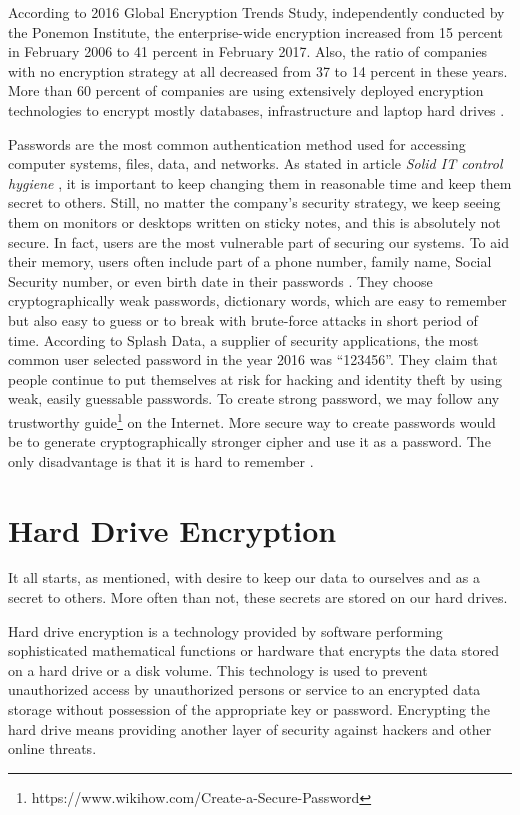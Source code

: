 According to 2016 Global Encryption Trends Study, independently conducted by the Ponemon Institute, the enterprise-wide encryption increased from 15 percent in February 2006 to 41 percent in February 2017.
Also, the ratio of companies with no encryption strategy at all decreased from 37 to 14 percent in these years.
More than 60 percent of companies are using extensively deployed encryption technologies to encrypt mostly databases, infrastructure and laptop hard drives \cite{Thales}.

Passwords are the most common authentication method used for accessing computer systems, files, data, and networks.
As stated in article {\it Solid IT control hygiene} \cite{Perry2017}\label{rotation}, it is important to keep changing them in reasonable time and keep them secret to others.
Still, no matter the company's security strategy, we keep seeing them on monitors or desktops written on sticky notes, and this is absolutely not secure.
In fact, users are the most vulnerable part of securing our systems.
To aid their memory, users often include part of a phone number, family name, Social Security number, or even birth date in their passwords \cite{pwdsec}.
They choose cryptographically weak passwords, dictionary words, which are easy to remember but also easy to guess or to break with brute-force attacks in short period of time.
According to Splash Data, a supplier of security applications, the most common user selected password in the year 2016 was “123456”.
They claim that people continue to put themselves at risk for hacking and identity theft by using weak, easily guessable passwords.
To create strong password, we may follow any trustworthy guide\footnote{https://www.wikihow.com/Create-a-Secure-Password} on the Internet.
More secure way to create passwords would be to generate cryptographically stronger cipher and use it as a password.
The only disadvantage is that it is hard to remember \cite{splashdata}.



\section{Hard Drive Encryption}

It all starts, as mentioned, with desire to keep our data to ourselves and as a secret to others.
More often than not, these secrets are stored on our hard drives.

Hard drive encryption is a technology provided by software performing sophisticated mathematical functions or hardware that encrypts the data stored on a hard drive or a disk volume.
This technology is used to prevent unauthorized access by unauthorized persons or service to an encrypted data storage without possession of the appropriate key or password.
Encrypting the hard drive means providing another layer of security against hackers and other online threats.

